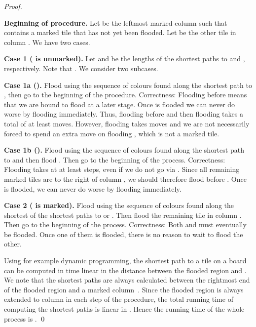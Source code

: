 \documentclass[a4paper,11pt]{llncs}
\newcounter{l}
\newcommand{\recdim}[2]{}
\begin{document}
\begin{proof}
    \begin{description}
        \item{\bf Beginning of procedure.} Let  be the leftmost marked column such that  contains a marked tile  that has not yet been flooded. Let  be the other tile in column . We have two cases.
\begin{description}
                \item{\bf Case 1 ( is unmarked).} Let  and  be the lengths of the shortest paths to  and , respectively. Note that . We consider two subcases.
\begin{description}
                        \item{\bf Case 1a ().} Flood using the sequence of colours found along the shortest path to , then go to the beginning of the procedure. Correctness: Flooding  before  means that we are bound to flood  at a later stage. Once  is flooded we can never do worse by flooding  immediately. Thus, flooding  before  and then flooding  takes a total of at least  moves. However, flooding  takes  moves and we are not necessarily forced to spend an extra move on flooding , which is not a marked tile.
                        \item{\bf Case 1b ().}  Flood using the sequence of colours found along the shortest path to  and then flood . Then go to the beginning of the process. Correctness: Flooding  takes at at least  steps, even if we do not go via . Since all remaining marked tiles are to the right of column , we should therefore flood  before . Once  is flooded, we can never do worse by flooding  immediately.
\end{description}
\item{\bf Case 2 ( is marked).} Flood using the sequence of colours found along the shortest of the shortest paths to  or . Then flood the remaining tile in column . Then go to the beginning of the process. Correctness: Both  and  must eventually be flooded. Once one of them is flooded, there is no reason to wait to flood the other.
            \end{description}
    \end{description}

    Using for example dynamic programming, the shortest path to a tile  on a \recdim{2}{n} board can be computed in time linear in the distance between the flooded region and . We note that the shortest paths are always calculated between the rightmost end of the flooded region and a marked column~. Since the flooded region is always extended to column  in each step of the procedure, the total running time of computing the shortest paths is linear in . Hence the running time of the whole process is . \qed
\end{proof}
\end{document}
